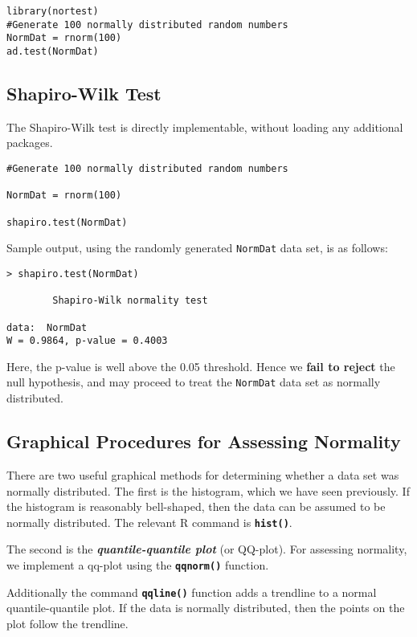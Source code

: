 \documentclass[a4paper,12pt]{article}
\begin{document}
\begin{framed}
\begin{verbatim}
library(nortest)
#Generate 100 normally distributed random numbers
NormDat = rnorm(100)
ad.test(NormDat)
\end{verbatim}
\end{framed}
\subsection{Shapiro-Wilk Test}
The Shapiro-Wilk test is directly implementable, without loading any additional packages.

\begin{framed}
\begin{verbatim}
#Generate 100 normally distributed random numbers

NormDat = rnorm(100)

shapiro.test(NormDat)
\end{verbatim}
\end{framed}
Sample output, using the randomly generated \texttt{NormDat} data set, is as follows:
\begin{verbatim}
> shapiro.test(NormDat)

        Shapiro-Wilk normality test

data:  NormDat
W = 0.9864, p-value = 0.4003
\end{verbatim}
Here, the p-value is well above the 0.05 threshold. Hence we \textbf{fail to reject} the null hypothesis, and may proceed to treat the \texttt{NormDat} data set as normally distributed.
\subsection{Graphical Procedures for Assessing Normality}
There are two useful graphical methods for determining whether a data set was normally distributed. The first is the histogram, which we have seen previously. If the histogram is reasonably bell-shaped, then the data can be assumed to be normally distributed. The relevant R command is \texttt{\textbf{hist()}}.


The second is the \textbf{\emph{quantile-quantile plot}} (or QQ-plot).
For assessing normality, we implement a qq-plot  using the \texttt{\textbf{qqnorm()}} function.

Additionally the command \texttt{\textbf{qqline()}} function adds a trendline to a normal quantile-quantile plot. If the data is normally distributed, then the points on the plot follow the trendline.
\end{document}
